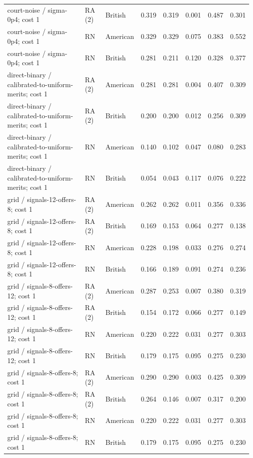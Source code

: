 \documentclass[10pt]{article}
\begin{document}
\begin{longtable}{@{}p{3.0in}llrrrrr@{}}
court-noise / sigma-0p4; cost 1 & RA (2) & British & 0.319 & 0.319 & 0.001 & 0.487 & 0.301\\
court-noise / sigma-0p4; cost 1 & RN & American & 0.329 & 0.329 & 0.075 & 0.383 & 0.552\\
court-noise / sigma-0p4; cost 1 & RN & British & 0.281 & 0.211 & 0.120 & 0.328 & 0.377\\
direct-binary / calibrated-to-uniform-merits; cost 1 & RA (2) & American & 0.281 & 0.281 & 0.004 & 0.407 & 0.309\\
direct-binary / calibrated-to-uniform-merits; cost 1 & RA (2) & British & 0.200 & 0.200 & 0.012 & 0.256 & 0.309\\
direct-binary / calibrated-to-uniform-merits; cost 1 & RN & American & 0.140 & 0.102 & 0.047 & 0.080 & 0.283\\
direct-binary / calibrated-to-uniform-merits; cost 1 & RN & British & 0.054 & 0.043 & 0.117 & 0.076 & 0.222\\
grid / signals-12-offers-8; cost 1 & RA (2) & American & 0.262 & 0.262 & 0.011 & 0.356 & 0.336\\
grid / signals-12-offers-8; cost 1 & RA (2) & British & 0.169 & 0.153 & 0.064 & 0.277 & 0.138\\
grid / signals-12-offers-8; cost 1 & RN & American & 0.228 & 0.198 & 0.033 & 0.276 & 0.274\\
grid / signals-12-offers-8; cost 1 & RN & British & 0.166 & 0.189 & 0.091 & 0.274 & 0.236\\
grid / signals-8-offers-12; cost 1 & RA (2) & American & 0.287 & 0.253 & 0.007 & 0.380 & 0.319\\
grid / signals-8-offers-12; cost 1 & RA (2) & British & 0.154 & 0.172 & 0.066 & 0.277 & 0.149\\
grid / signals-8-offers-12; cost 1 & RN & American & 0.220 & 0.222 & 0.031 & 0.277 & 0.303\\
grid / signals-8-offers-12; cost 1 & RN & British & 0.179 & 0.175 & 0.095 & 0.275 & 0.230\\
grid / signals-8-offers-8; cost 1 & RA (2) & American & 0.290 & 0.290 & 0.003 & 0.425 & 0.309\\
grid / signals-8-offers-8; cost 1 & RA (2) & British & 0.264 & 0.146 & 0.007 & 0.317 & 0.200\\
grid / signals-8-offers-8; cost 1 & RN & American & 0.220 & 0.222 & 0.031 & 0.277 & 0.303\\
grid / signals-8-offers-8; cost 1 & RN & British & 0.179 & 0.175 & 0.095 & 0.275 & 0.230\\

\end{longtable}
\end{document}
